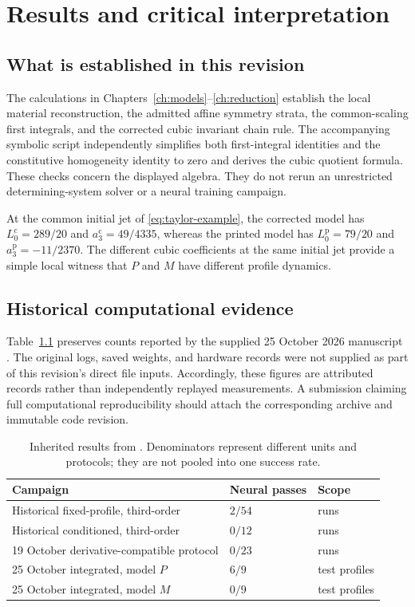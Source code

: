 \documentclass[11pt,a4paper,oneside]{report}
\numberwithin{equation}{chapter}
\begin{document}
\chapter{Results and critical interpretation}\label{ch:results}
\section{What is established in this revision}
The calculations in Chapters~\ref{ch:models}--\ref{ch:reduction} establish the local material reconstruction, the admitted affine symmetry strata, the common-scaling first integrals, and the corrected cubic invariant chain rule. The accompanying symbolic script independently simplifies both first-integral identities and the constitutive homogeneity identity to zero and derives the cubic quotient formula. These checks concern the displayed algebra. They do not rerun an unrestricted determining-system solver or a neural training campaign.

At the common initial jet of \eqref{eq:taylor-example}, the corrected model has $L_0^{\mathrm c}=289/20$ and $a_3^{\mathrm c}=49/4335$, whereas the printed model has $L_0^{\mathrm p}=79/20$ and $a_3^{\mathrm p}=-11/2370$. The different cubic coefficients at the same initial jet provide a simple local witness that $P$ and $M$ have different profile dynamics.

\section{Historical computational evidence}
Table~\ref{tab:historical} preserves counts reported by the supplied 25 October 2026 manuscript \cite{projectdraft}. The original logs, saved weights, and hardware records were not supplied as part of this revision's direct file inputs. Accordingly, these figures are attributed records rather than independently replayed measurements. A submission claiming full computational reproducibility should attach the corresponding archive and immutable code revision.

\begin{table}[htbp]\centering\small
\begin{tabularx}{\textwidth}{@{}Xll@{}}\toprule
Campaign & Neural passes & Scope\\\midrule
Historical fixed-profile, third-order & $2/54$ & runs\\
Historical conditioned, third-order & $0/12$ & runs\\
19 October derivative-compatible protocol & $0/23$ & runs\\
25 October integrated, model $P$ & $6/9$ & test profiles\\
25 October integrated, model $M$ & $0/9$ & test profiles\\\bottomrule
\end{tabularx}
\caption{Inherited results from \cite{projectdraft}. Denominators represent different units and protocols; they are not pooled into one success rate.}\label{tab:historical}
\end{table}
\end{document}
